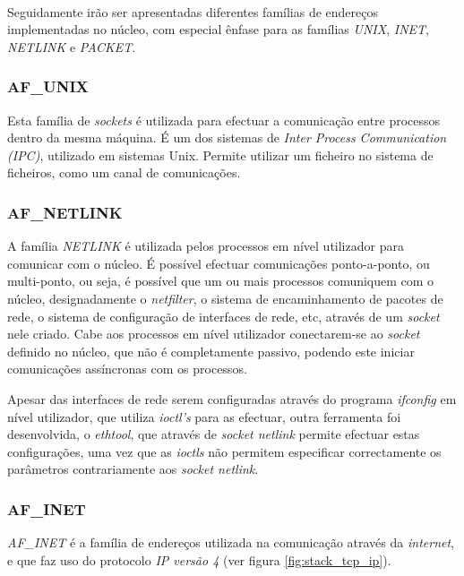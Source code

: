 \paragraph*{}
Seguidamente irão ser apresentadas diferentes famílias de endereços implementadas no núcleo, com especial ênfase para as famílias \textit{UNIX}, \textit{INET}, \textit{NETLINK} e \textit{PACKET}.


\subsubsection{AF\_UNIX}

Esta família de \textit{sockets} é utilizada para efectuar a comunicação entre processos dentro da mesma máquina.
É um dos sistemas de \textit{Inter Process Communication (IPC)}, utilizado em sistemas Unix.
\color{red}Permite utilizar um ficheiro no sistema de ficheiros, como um canal de comunicações.\color{black}

\subsubsection{AF\_NETLINK}

A família \textit{NETLINK} é utilizada pelos processos em nível utilizador para comunicar com o núcleo.
É possível efectuar comunicações ponto-a-ponto, ou multi-ponto, ou seja, é possível que um ou mais processos comuniquem com o núcleo, designadamente o \textit{netfilter}, o sistema de encaminhamento de pacotes de rede, o sistema de configuração de interfaces de rede, etc, através de um \textit{socket} nele criado.
Cabe aos processos em nível utilizador conectarem-se ao \textit{socket} definido no núcleo, que não é completamente passivo, podendo este iniciar comunicações assíncronas com os processos.

Apesar das interfaces de rede serem configuradas através do programa \textit{ifconfig} em nível utilizador, que utiliza \textit{ioctl's} para as efectuar, outra ferramenta foi desenvolvida, o \textit{ethtool}, que através de \textit{socket netlink} permite efectuar estas configurações, uma vez que as \textit{ioctls} não permitem especificar correctamente os parâmetros contrariamente aos \textit{socket netlink}.

\subsubsection{AF\_INET}
\label{subsub:af_inet}

\textit{AF\_INET} é a família de endereços utilizada na comunicação através da \textit{internet}, e que faz uso do protocolo \textit{IP versão 4} (ver figura \ref{fig:stack_tcp_ip}).

